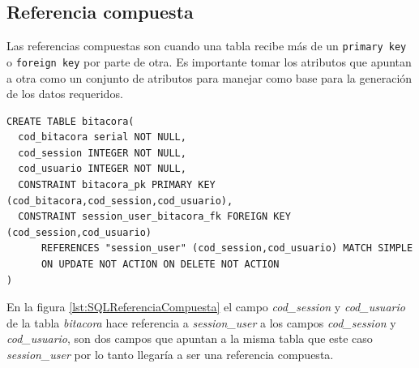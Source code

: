 \subsection{Referencia compuesta}
Las referencias compuestas son cuando una tabla recibe m\'as de un \texttt{primary key} o \texttt{foreign key} por parte de otra. Es importante tomar los atributos que apuntan a otra como un conjunto de atributos para manejar como base para la generaci\'on de los datos requeridos.
\lstset{language=sql,breaklines=true}
\label{lst:SQLReferenciaCompuesta}
\begin{lstlisting}
CREATE TABLE bitacora(
  cod_bitacora serial NOT NULL,
  cod_session INTEGER NOT NULL,
  cod_usuario INTEGER NOT NULL,	  
  CONSTRAINT bitacora_pk PRIMARY KEY (cod_bitacora,cod_session,cod_usuario),
  CONSTRAINT session_user_bitacora_fk FOREIGN KEY (cod_session,cod_usuario)
      REFERENCES "session_user" (cod_session,cod_usuario) MATCH SIMPLE
      ON UPDATE NOT ACTION ON DELETE NOT ACTION
)
\end{lstlisting}
En la figura \ref{lst:SQLReferenciaCompuesta} el campo \textit{cod\_session} y \textit{cod\_usuario} de la tabla \textit{bitacora} hace referencia a \textit{session\_user} a los campos \textit{cod\_session} y \textit{cod\_usuario}, son dos campos que apuntan a la misma tabla que este caso \textit{session\_user} por lo tanto llegar\'ia a ser una referencia compuesta.